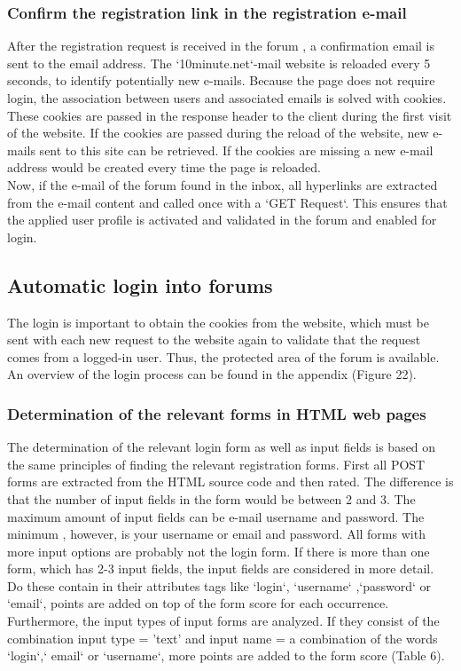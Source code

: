 \subsubsection {Confirm the registration link in the registration e-mail}
After the registration request is received in the forum , a confirmation email is sent to the email address. The `10minute.net`-mail website is reloaded every 5 seconds, to identify potentially new e-mails. Because the page does not require login, the association between users and associated emails is solved with cookies. These cookies are passed in the response header to the client during the first visit of the website.
If the cookies are passed during the reload of the website, new e-mails sent to this site can be retrieved. If the cookies are missing a new e-mail address would be created every time the page is reloaded.\\
Now, if the e-mail of the forum found in the inbox, all hyperlinks are extracted from the e-mail content and called once with a `GET Request`. This ensures that the applied user profile is activated and validated in the forum and enabled for login.


\subsection{Automatic login into forums }
The login is important to obtain the cookies from the website, which must be sent with each new request to the website again to validate that the request comes from a logged-in user. Thus, the protected area of the forum is available. An overview of the login process can be found in the appendix (Figure 22).

\subsubsection {Determination of the relevant forms in HTML web pages}
The determination of the relevant login form as well as input fields is based on the same principles of finding the relevant registration forms. First all POST forms are extracted from the HTML source code and then rated. The difference is that the number of input fields in the form would be between 2 and 3. The maximum amount of input fields can be e-mail username and password. The minimum , however, is your username or email and password. All forms with more input options are probably not the login form.
If there is more than one form, which has 2-3 input fields, the input fields are considered in more detail. \\
Do these contain in their attributes tags like `login`, `username` ,`password` or `email`, points are added on top of the form score for each occurrence. Furthermore, the input types of input forms are analyzed. If they consist of the combination input type = 'text' and input name = a combination of the words `login`,` email` or `username`, more points are added to the form score (Table 6).

